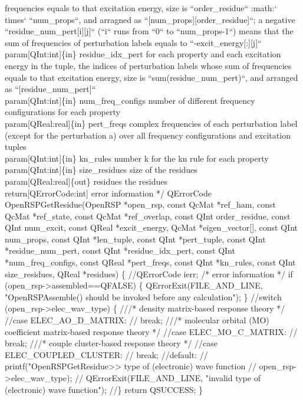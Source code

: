          frequencies equals to that excitation energy, size is ``order_residue``
         :math:`\\times` ``num_props``, and arragned as ``[num_props][order_residue]``;
         a negative ``residue_num_pert[i][j]`` (``i`` runs from ``0`` to
         ``num_props-1``) means that the sum of frequencies of perturbation
         labels equals to ``-excit_energy[:][j]``
     \\param[QInt:int]\{in\} residue_idx_pert for each property and each excitation energy
         in the tuple, the indices of perturbation labels whose sum of
         frequencies equals to that excitation energy, size is
         ``sum(residue_num_pert)``, and arranged as ``[residue_num_pert]``
     \\param[QInt:int]\{in\} num_freq_configs number of different frequency
         configurations for each property
     \\param[QReal:real]\{in\} pert_freqs complex frequencies of each perturbation
         label (except for the perturbation a) over all frequency configurations
         and excitation tuples
     \\param[QInt:int]\{in\} kn_rules number k for the kn rule for each property
     \\param[QInt:int]\{in\} size_residues size of the residues
     \\param[QReal:real]\{out\} residues the residues
     \\return[QErrorCode:int] error information
*/
QErrorCode OpenRSPGetResidue(OpenRSP *open_rsp,
                             const QcMat *ref_ham,
                             const QcMat *ref_state,
                             const QcMat *ref_overlap,
                             const QInt order_residue,
                             const QInt num_excit,
                             const QReal *excit_energy,
                             QcMat *eigen_vector[],
                             const QInt num_props,
                             const QInt *len_tuple,
                             const QInt *pert_tuple,
                             const QInt *residue_num_pert,
                             const QInt *residue_idx_pert,
                             const QInt *num_freq_configs,
                             const QReal *pert_freqs,
                             const QInt *kn_rules,
                             const QInt size_residues,
                             QReal *residues)
\{
    //QErrorCode ierr;  /* error information */
    if (open_rsp->assembled==QFALSE) \{
        QErrorExit(FILE_AND_LINE, "OpenRSPAssemble() should be invoked before any calculation");
    \}
    //switch (open_rsp->elec_wav_type) \{
    ///* density matrix-based response theory */
    //case ELEC_AO_D_MATRIX:
    //    break;
    ///* molecular orbital (MO) coefficient matrix-based response theory */
    //case ELEC_MO_C_MATRIX:
    //    break;
    ///* couple cluster-based response theory */
    //case ELEC_COUPLED_CLUSTER:
    //    break;
    //default:
    //    printf("OpenRSPGetResidue>> type of (electronic) wave function %
    //           open_rsp->elec_wav_type);
    //    QErrorExit(FILE_AND_LINE, "invalid type of (electronic) wave function");
    //\}
    return QSUCCESS;
\}

